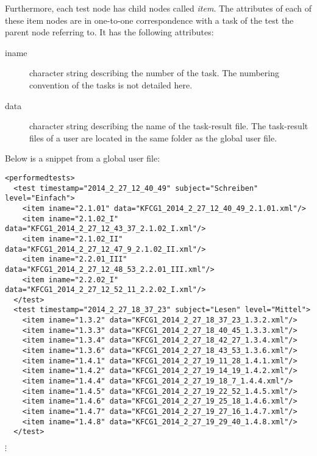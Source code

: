 \documentclass{scrartcl}
\begin{document}
Furthermore, each test node has child nodes called \emph{item}. The attributes of each of these item nodes are in one-to-one correspondence with a task of the test the parent node referring to. It has the following attributes:
\begin{description}
\item[iname] character string describing the number of the task. The numbering convention of the tasks is not detailed here.
\item[data] character string describing the name of the task-result file. The task-result files of a user are located in the same folder as the global user file. 
\end{description}
Below is a snippet from a global user file:
\begin{verbatim}  
<performedtests>
  <test timestamp="2014_2_27_12_40_49" subject="Schreiben" level="Einfach">
    <item iname="2.1.01" data="KFCG1_2014_2_27_12_40_49_2.1.01.xml"/>
    <item iname="2.1.02_I" data="KFCG1_2014_2_27_12_43_37_2.1.02_I.xml"/>
    <item iname="2.1.02_II" data="KFCG1_2014_2_27_12_47_9_2.1.02_II.xml"/>
    <item iname="2.2.01_III" data="KFCG1_2014_2_27_12_48_53_2.2.01_III.xml"/>
    <item iname="2.2.02_I" data="KFCG1_2014_2_27_12_52_11_2.2.02_I.xml"/>
  </test>
  <test timestamp="2014_2_27_18_37_23" subject="Lesen" level="Mittel">
    <item iname="1.3.2" data="KFCG1_2014_2_27_18_37_23_1.3.2.xml"/>
    <item iname="1.3.3" data="KFCG1_2014_2_27_18_40_45_1.3.3.xml"/>
    <item iname="1.3.4" data="KFCG1_2014_2_27_18_42_27_1.3.4.xml"/>
    <item iname="1.3.6" data="KFCG1_2014_2_27_18_43_53_1.3.6.xml"/>
    <item iname="1.4.1" data="KFCG1_2014_2_27_19_11_28_1.4.1.xml"/>
    <item iname="1.4.2" data="KFCG1_2014_2_27_19_14_19_1.4.2.xml"/>
    <item iname="1.4.4" data="KFCG1_2014_2_27_19_18_7_1.4.4.xml"/>
    <item iname="1.4.5" data="KFCG1_2014_2_27_19_22_52_1.4.5.xml"/>
    <item iname="1.4.6" data="KFCG1_2014_2_27_19_25_18_1.4.6.xml"/>
    <item iname="1.4.7" data="KFCG1_2014_2_27_19_27_16_1.4.7.xml"/>
    <item iname="1.4.8" data="KFCG1_2014_2_27_19_29_40_1.4.8.xml"/>
  </test>
\end{verbatim}
\quad$\vdots$
\end{document}
